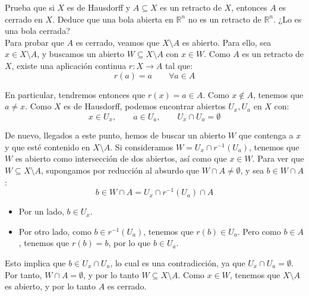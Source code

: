 \begin{ejercicio} %
    Prueba que si $X$ es de Hausdorff y $A\subseteq X$ es un retracto de $X$, entonces $A$ es cerrado en $X$. Deduce que una bola abierta en $\mathbb{R}^n$ no es un retracto de $\mathbb{R}^n$. ¿Lo es una bola cerrada?\\

    \noindent
    Para probar que $A$ es cerrado, veamos que $X\setminus A$ es abierto. Para ello, sea $x\in X\setminus A$, y buscamos un abierto $W\subseteq X\setminus A$ con $x\in W$. Como $A$ es un retracto de $X$, existe una aplicación continua $r:X\to A$ tal que:
    \begin{equation*}
        r(a) = a \qquad \forall a\in A
    \end{equation*}
    
    En particular, tendremos entonces que $r(x)=a\in A$. Como $x\notin A$, tenemos que $a \neq x$. Como $X$ es de Hausdorff, podemos encontrar abiertos $U_x, U_a$ en $X$ con:
    \begin{equation*}
        x\in U_x, \qquad a\in U_a,\qquad U_x\cap U_a = \emptyset 
    \end{equation*}

    De nuevo, llegados a este punto, hemos de buscar un abierto $W$ que contenga a $x$ y que esté contenido en $X\setminus A$. Si consideramos $W=U_x\cap r^{-1}(U_a)$, tenemos que $W$ es abierto como intersección de dos abiertos, así como que $x\in W$. Para ver que $W\subseteq X\setminus A$, supongamos por reducción al absurdo que $W\cap A \neq \emptyset$, y sea $b\in W\cap A$:
    \begin{equation*}
        b\in W\cap A = U_x\cap r^{-1}(U_a)\cap A
    \end{equation*}
    \begin{itemize}
        \item Por un lado, $b\in U_x$.
        \item Por otro lado, como $b\in r^{-1}(U_a)$, tenemos que $r(b)\in U_a$. Pero como $b\in A$, tenemos que $r(b) = b$, por lo que $b\in U_a$.
    \end{itemize}

    Esto implica que $b\in U_x\cap U_a$, lo cual es una contradicción, ya que $U_x\cap U_a = \emptyset$. Por tanto, $W\cap A = \emptyset$, y por lo tanto $W\subseteq X\setminus A$. Como $x\in W$, tenemos que $X\setminus A$ es abierto, y por lo tanto $A$ es cerrado.\\


\end{ejercicio}

